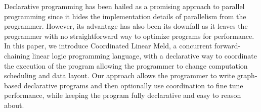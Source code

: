 Declarative programming has been hailed as a promising approach to
parallel programming since it hides the implementation details of
parallelism from the programmer. However, its advantage has also been
its downfall as it leaves the programmer with no straightforward way
to optimize programs for performance.  In this paper, we introduce
Coordinated Linear Meld, a concurrent forward-chaining linear logic
programming language, with a declarative way to coordinate the
execution of the program allowing the programmer to change computation
scheduling and data layout. Our approach allows the programmer to
write graph-based declarative programs and then optionally use
coordination to fine tune performance, while keeping the program fully
declarative and easy to reason about.

